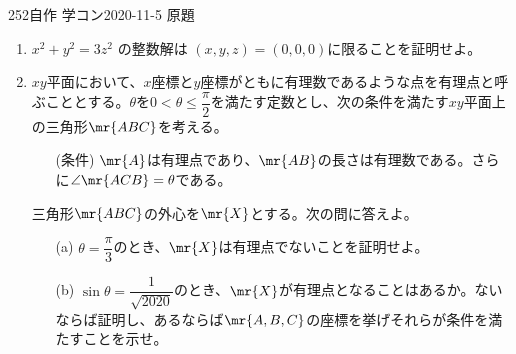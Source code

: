 \begin{thm}{252}{\maru}{自作 学コン2020-11-5 原題}
 \begin{enumerate}
  \item $x^2+y^2=3z^2$ の整数解は $(x,y,z)=(0,0,0)$に限ることを証明せよ。
  \item $xy$平面において、$x$座標と$y$座標がともに有理数であるような点を有理点と呼ぶこととする。$\theta$を$0<\theta\le\dfrac{\pi}{2}$を満たす定数とし、次の条件を満たす$xy$平面上の三角形$\mr{ABC}$を考える。
  \begin{itemize}
   \item[(条件)] $\mr{A}$は有理点であり、$\mr{AB}$の長さは有理数である。さらに$\angle\mr{ACB}=\theta$である。
  \end{itemize}
  三角形$\mr{ABC}$の外心を$\mr{X}$とする。次の問に答えよ。
  \begin{itemize}
   \item[(a)] $\theta=\dfrac{\pi}{3}$のとき、$\mr{X}$は有理点でないことを証明せよ。
   \item[(b)] $\sin\theta=\dfrac{1}{\sqrt{2020}}$のとき、$\mr{X}$が有理点となることはあるか。ないならば証明し、あるならば$\mr{A,B,C}$の座標を挙げそれらが条件を満たすことを示せ。 
  \end{itemize}
 \end{enumerate}
\end{thm}